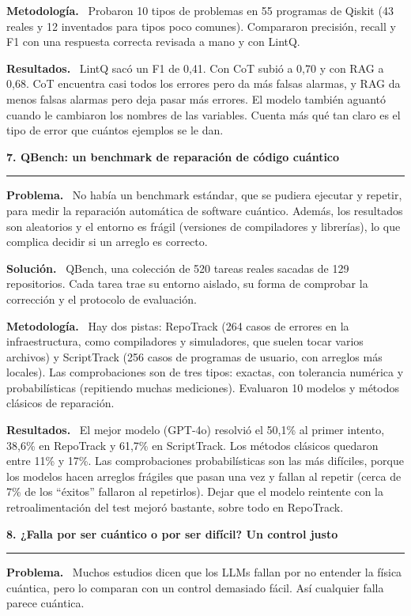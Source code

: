 \documentclass[11pt,a4paper]{article}
\newcommand{\paper}[1]{\vspace{1.2em}\par{\large\textbf{#1}}\par\vspace{0.2em}\hrule\vspace{0.4em}}
\newcommand{\parte}[1]{\par\textbf{#1.}\ }
\begin{document}
\parte{Metodología}
Probaron 10 tipos de problemas en 55 programas de Qiskit (43 reales y 12 inventados para tipos poco comunes). Compararon precisión, recall y F1 con una respuesta correcta revisada a mano y con LintQ.

\parte{Resultados}
LintQ sacó un F1 de 0,41. Con CoT subió a 0,70 y con RAG a 0,68. CoT encuentra casi todos los errores pero da más falsas alarmas, y RAG da menos falsas alarmas pero deja pasar más errores. El modelo también aguantó cuando le cambiaron los nombres de las variables. Cuenta más qué tan claro es el tipo de error que cuántos ejemplos se le dan.

\paper{7. QBench: un benchmark de reparación de código cuántico}

\parte{Problema}
No había un benchmark estándar, que se pudiera ejecutar y repetir, para medir la reparación automática de software cuántico. Además, los resultados son aleatorios y el entorno es frágil (versiones de compiladores y librerías), lo que complica decidir si un arreglo es correcto.

\parte{Solución}
QBench, una colección de 520 tareas reales sacadas de 129 repositorios. Cada tarea trae su entorno aislado, su forma de comprobar la corrección y el protocolo de evaluación.

\parte{Metodología}
Hay dos pistas: RepoTrack (264 casos de errores en la infraestructura, como compiladores y simuladores, que suelen tocar varios archivos) y ScriptTrack (256 casos de programas de usuario, con arreglos más locales). Las comprobaciones son de tres tipos: exactas, con tolerancia numérica y probabilísticas (repitiendo muchas mediciones). Evaluaron 10 modelos y métodos clásicos de reparación.

\parte{Resultados}
El mejor modelo (GPT-4o) resolvió el 50,1\% al primer intento, 38,6\% en RepoTrack y 61,7\% en ScriptTrack. Los métodos clásicos quedaron entre 11\% y 17\%. Las comprobaciones probabilísticas son las más difíciles, porque los modelos hacen arreglos frágiles que pasan una vez y fallan al repetir (cerca de 7\% de los ``éxitos'' fallaron al repetirlos). Dejar que el modelo reintente con la retroalimentación del test mejoró bastante, sobre todo en RepoTrack.

\paper{8. ¿Falla por ser cuántico o por ser difícil? Un control justo}

\parte{Problema}
Muchos estudios dicen que los LLMs fallan por no entender la física cuántica, pero lo comparan con un control demasiado fácil. Así cualquier falla parece cuántica.
\end{document}
